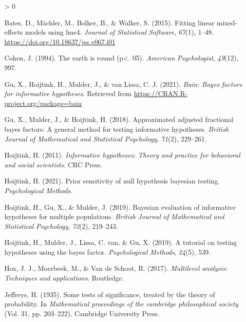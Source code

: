 \documentclass[
  english,
  man]{apa6}
\newlength{\cslhangindent}
\newenvironment{CSLReferences}[2] %
 {%
  \setlength{\parindent}{0pt}
  \ifodd #1 \everypar{\setlength{\hangindent}{\cslhangindent}}\ignorespaces\fi
  \ifnum #2 > 0
  \setlength{\parskip}{#2\baselineskip}
  \fi
 }%
 {}
\begin{document}
\hypertarget{refs}{}
\begin{CSLReferences}{1}{0}
\leavevmode\hypertarget{ref-lme4}{}%
Bates, D., Mächler, M., Bolker, B., \& Walker, S. (2015). Fitting linear mixed-effects models using {lme4}. \emph{Journal of Statistical Software}, \emph{67}(1), 1--48. \url{https://doi.org/10.18637/jss.v067.i01}

\leavevmode\hypertarget{ref-cohen1994earth}{}%
Cohen, J. (1994). The earth is round (p\textless. 05). \emph{American Psychologist}, \emph{49}(12), 997.

\leavevmode\hypertarget{ref-bain}{}%
Gu, X., Hoijtink, H., Mulder, J., \& van Lissa, C. J. (2021). \emph{Bain: Bayes factors for informative hypotheses}. Retrieved from \url{https://CRAN.R-project.org/package=bain}

\leavevmode\hypertarget{ref-gu2018approximated}{}%
Gu, X., Mulder, J., \& Hoijtink, H. (2018). Approximated adjusted fractional bayes factors: A general method for testing informative hypotheses. \emph{British Journal of Mathematical and Statistical Psychology}, \emph{71}(2), 229--261.

\leavevmode\hypertarget{ref-hoijtink2011informative}{}%
Hoijtink, H. (2011). \emph{Informative hypotheses: Theory and practice for behavioral and social scientists}. CRC Press.

\leavevmode\hypertarget{ref-hoijtink2021prior}{}%
Hoijtink, H. (2021). Prior sensitivity of null hypothesis bayesian testing. \emph{Psychological Methods}.

\leavevmode\hypertarget{ref-hoijtink2019bayesian}{}%
Hoijtink, H., Gu, X., \& Mulder, J. (2019). Bayesian evaluation of informative hypotheses for multiple populations. \emph{British Journal of Mathematical and Statistical Psychology}, \emph{72}(2), 219--243.

\leavevmode\hypertarget{ref-hoijtink2019tutorial}{}%
Hoijtink, H., Mulder, J., Lissa, C. van, \& Gu, X. (2019). A tutorial on testing hypotheses using the bayes factor. \emph{Psychological Methods}, \emph{24}(5), 539.

\leavevmode\hypertarget{ref-hox2017multilevel}{}%
Hox, J. J., Moerbeek, M., \& Van de Schoot, R. (2017). \emph{Multilevel analysis: Techniques and applications}. Routledge.

\leavevmode\hypertarget{ref-jeffreys1935some}{}%
Jeffreys, H. (1935). Some tests of significance, treated by the theory of probability. In \emph{Mathematical proceedings of the cambridge philosophical society} (Vol. 31, pp. 203--222). Cambridge University Press.


\end{CSLReferences}
\end{document}
